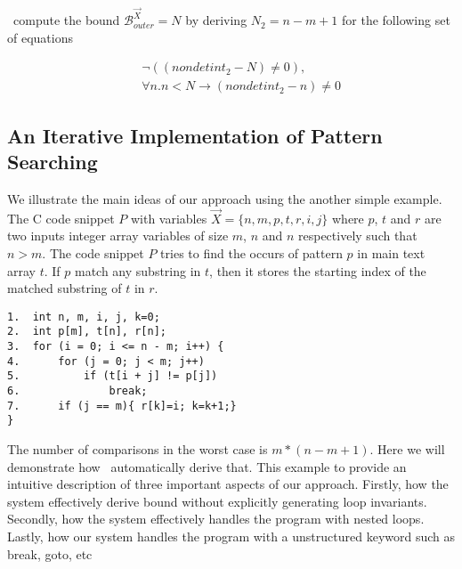 \SystemName\ compute the bound $\mathcal{B}^{\vec{X}}_{outer}=N$ by deriving $N_2=n-m+1$ for the following set of equations

\begin{eqnarray*}
	&&\neg ((nondetint_2-N)\not=0), \\
    &&\forall n. n<N\rightarrow (nondetint_2-n)\not=0 
\end{eqnarray*}



\subsection{An Iterative Implementation of Pattern Searching}\label{example_details1}
We illustrate the main ideas of our approach using the another simple example. The C code snippet $P$ with variables $\vec{X}=\{n, m, p, t, r, i, j\}$ where $p$, $t$ and $r$ are two inputs integer array variables of size $m$, $n$ and $n$ respectively such that $n > m$. The code snippet $P$ tries to find the occurs of pattern $p$ in main text array $t$. If $p$ match any substring in $t$, then it stores the starting index of the matched substring of $t$ in $r$.


\begin{verbatim}
1.  int n, m, i, j, k=0;
2.  int p[m], t[n], r[n];
3.  for (i = 0; i <= n - m; i++) { 
4.      for (j = 0; j < m; j++) 
5.          if (t[i + j] != p[j]) 
6.              break; 
7.      if (j == m){ r[k]=i; k=k+1;}
}
\end{verbatim}

The number of comparisons in the worst case is $m*(n-m+1)$. Here we will demonstrate how \SystemName\ automatically derive that. This example to provide an intuitive description of three important aspects of our approach.  Firstly, how the system effectively derive bound without explicitly generating loop invariants. Secondly, how the system effectively handles the program with nested loops. Lastly, how our system handles the program with a unstructured keyword such as break, goto, etc





